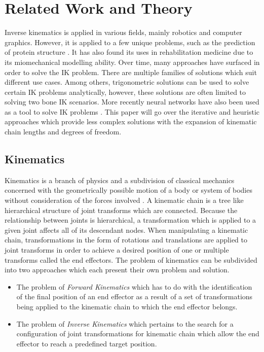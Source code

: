 \chapter{Related Work and Theory}
Inverse kinematics is applied in various fields, mainly robotics and computer
graphics. However, it is applied to a few unique problems, such as the
prediction of protein structure \cite{ccd_protein}. It has also found its uses in
rehabilitation medicine due to its miomechanical modelling ability. Over time,
many approaches have surfaced in order to solve the IK problem. There are
multiple families of solutions \cite{Aristidou2011} which suit different use
cases. Among others, trigonometric solutions can be used to solve certain IK
problems analytically, however, these solutions are often limited to solving two
bone IK scenarios. More recently neural networks have also been used as a tool
to solve IK problems \cite{nn_IK}. This paper will go over the iterative and heuristic
approaches which provide less complex solutions with the expansion of kinematic
chain lengths and degrees of freedom.

\section{Kinematics}
Kinematics is a branch of physics and a subdivision of classical mechanics
concerned with the geometrically possible motion of a body or system of bodies
without consideration of the forces involved \cite{kinematics_britannica}.
A kinematic chain is a tree like hierarchical structure of joint transforms
which are connected. Because the relationship between joints is hierarchical,
a transformation which is applied to a given joint affects all of its descendant
nodes. When manipulating a kinematic chain, transformations in the form of
rotations and translations are applied to joint transforms in order to achieve
a desired position of one or multiple transforms called the end effectors. The
problem of kinematics can be subdivided into two approaches which each present
their own problem and solution.

\begin{itemize}
    \item The problem of \textit{Forward Kinematics} which has to do with the
        identification of the final position of an end effector as a result of
        a set of transformations being applied to the kinematic chain to which
        the end effector belongs.
    \item The problem of \textit{Inverse Kinematics} which pertains to the
        search for a configuration of joint transformations for kinematic
        chain which allow the end effector to reach a predefined target
        position.
\end{itemize}

